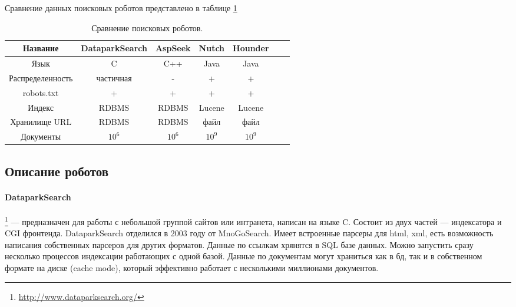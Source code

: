 Сравнение данных поисковых роботов представлено в таблице \ref{tab:crawlers}
\begin{table}[h]
\caption{\label{tab:crawlers}Сравнение поисковых роботов.}
\begin{center}
\begin{tabular}{|c|c|c|c|c|c|c|}

\hline
Название & DataparkSearch & AspSeek & Nutch & Hounder \\
\hline
Язык & C & C++ & Java & Java \\
\hline
Распределенность & частичная & - & + & + \\
\hline
robots.txt & + & + & + & + \\
\hline
Индекс & RDBMS & RDBMS & Lucene & Lucene \\
\hline
Хранилище URL & RDBMS & RDBMS & файл & файл \\
\hline
Документы & $10^{6}$ & $10^{6}$ & $10^{9}$ & $10^{9}$ \\
\hline

% 
\end{tabular}
\end{center}
\end{table}


\subsection{Описание роботов}
\paragraph{DataparkSearch}\footnote{\href{http://www.dataparksearch.org/}{http://www.dataparksearch.org/}} --- предназначен для работы с небольшой группой сайтов или интранета, написан на языке C. Состоит из двух частей --- индексатора и CGI фронтенда. DataparkSearch отделился в 2003 году от MnoGoSearch. Имеет встроенные парсеры для html, xml, есть возможность написания собственных парсеров для других форматов. Данные по ссылкам хрянятся в SQL базе данных. Можно запустить сразу несколько процессов индексации работающих с одной базой. Данные по документам могут храниться как в бд, так и в собственном формате на диске (cache mode), который эффективно работает с несколькими миллионами документов.

